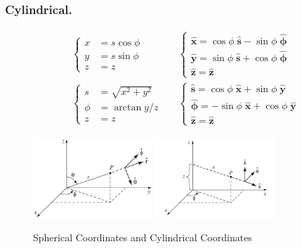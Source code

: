 \documentclass[../main.tex]{subfiles}
\begin{document}
\subsubsection*{Cylindrical.}
\begin{align*}
   & \begin{cases}
        x &= s \cos \phi \\
        y &= s \sin \phi \\
        z & =z
    \end{cases}&&
    \begin{cases}
        \mathbf{\hat{x}} =  \cos \phi \;\mathbf{\hat{s}}-  \sin \phi \;\boldsymbol{\hat{\phi}} \\
        \mathbf{\hat{y}} =  \sin \phi \;\mathbf{\hat{s}} + \cos \phi \;\boldsymbol{\hat{\phi}} \\
        \mathbf{\hat{z}} = \mathbf{\hat{z}} 
    \end{cases}\\
   &\begin{cases}
        s &= \sqrt{x^2 + y^2 }\\
        \phi &=\arctan y/z\\
        z & = z
    \end{cases}&&
    \begin{cases} 
        \mathbf{\hat{s}} =  \cos \phi \;\mathbf{\hat{x}} +  \sin \phi \;\boldsymbol{\hat{y}}\\
        \boldsymbol{\hat{\phi}} = -\sin  \phi \;\mathbf{\hat{x}} + \cos \phi \;\boldsymbol{\hat{y}} \\
        \boldsymbol{\hat{z}} = \boldsymbol{\hat{z}}
    \end{cases}
\end{align*}

\begin{figure}
    \centering
    \includegraphics[width=0.4\textwidth]{Spherical.png}
    \includegraphics[width=0.4\textwidth]{Cyl.png}
    \caption*{Spherical Coordinates and Cylindrical Coordinates}
\end{figure}
\end{document}
